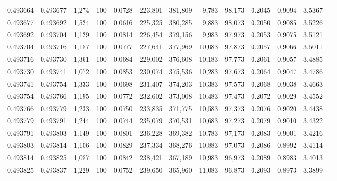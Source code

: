 \begin{tabular}{rrrrrrrrrrrrr}
0.493664 & 0.493677 & 1,274 & 100 &                                     0.0728 & 223,801 & 381,809 &   9,783 &  98,173 & 0.2045 & 0.9094 & 3.5367 \\
0.493677 & 0.493692 & 1,524 & 100 &                                     0.0616 & 225,325 & 380,285 &   9,883 &  98,073 & 0.2050 & 0.9085 & 3.5226 \\
0.493692 & 0.493704 & 1,129 & 100 &                                     0.0814 & 226,454 & 379,156 &   9,983 &  97,973 & 0.2053 & 0.9075 & 3.5121 \\
0.493704 & 0.493716 & 1,187 & 100 &                                     0.0777 & 227,641 & 377,969 &  10,083 &  97,873 & 0.2057 & 0.9066 & 3.5011 \\
0.493716 & 0.493730 & 1,361 & 100 &                                     0.0684 & 229,002 & 376,608 &  10,183 &  97,773 & 0.2061 & 0.9057 & 3.4885 \\
0.493730 & 0.493741 & 1,072 & 100 &                                     0.0853 & 230,074 & 375,536 &  10,283 &  97,673 & 0.2064 & 0.9047 & 3.4786 \\
0.493741 & 0.493754 & 1,333 & 100 &                                     0.0698 & 231,407 & 374,203 &  10,383 &  97,573 & 0.2068 & 0.9038 & 3.4663 \\
0.493754 & 0.493766 & 1,195 & 100 &                                     0.0772 & 232,602 & 373,008 &  10,483 &  97,473 & 0.2072 & 0.9029 & 3.4552 \\
0.493766 & 0.493779 & 1,233 & 100 &                                     0.0750 & 233,835 & 371,775 &  10,583 &  97,373 & 0.2076 & 0.9020 & 3.4438 \\
0.493779 & 0.493791 & 1,244 & 100 &                                     0.0744 & 235,079 & 370,531 &  10,683 &  97,273 & 0.2079 & 0.9010 & 3.4322 \\
0.493791 & 0.493803 & 1,149 & 100 &                                     0.0801 & 236,228 & 369,382 &  10,783 &  97,173 & 0.2083 & 0.9001 & 3.4216 \\
0.493803 & 0.493814 & 1,106 & 100 &                                     0.0829 & 237,334 & 368,276 &  10,883 &  97,073 & 0.2086 & 0.8992 & 3.4114 \\
0.493814 & 0.493825 & 1,087 & 100 &                                     0.0842 & 238,421 & 367,189 &  10,983 &  96,973 & 0.2089 & 0.8983 & 3.4013 \\
0.493825 & 0.493837 & 1,229 & 100 &                                     0.0752 & 239,650 & 365,960 &  11,083 &  96,873 & 0.2093 & 0.8973 & 3.3899 \\

\end{tabular}

